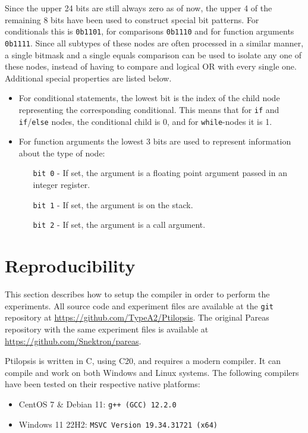 \documentclass[11pt,dvipsnames]{article}
\newcommand{\icpp}[1]{\texttt{#1}}
\newcommand{\mono}[1]{\texttt{#1}}
\newcommand{\Rplus}{\protect\hspace{-.1em}\protect\raisebox{.35ex}{\smaller{\smaller\textbf{+}}}}
\newcommand{\Cpp}{\mbox{C\Rplus\Rplus}\xspace}
\newcommand{\CppXX}{\mbox{C\Rplus\Rplus20}\xspace}
\begin{document}
Since the upper 24 bits are still always zero as of now, the upper 4 of the remaining 8 bits have been used to construct special bit patterns. For conditionals this is \mono{0b1101}, for comparisons \mono{0b1110} and for function arguments \mono{0b1111}. Since all subtypes of these nodes are often processed in a similar manner, a single bitmask and a single equals comparison can be used to isolate any one of these nodes, instead of having to compare and logical OR with every single one. Additional special properties are listed below.
\begin{itemize}
    \item For conditional statements, the lowest bit is the index of the child node representing the corresponding conditional. This means that for \icpp{if} and \icpp{if}/\icpp{else} nodes, the conditional child is 0, and for \icpp{while}-nodes it is 1.
    \item For function arguments the lowest 3 bits are used to represent information about the type of node:
    \begin{itemize}
        \item[\mono{bit 0}] - If set, the argument is a floating point argument passed in an integer register.
        \item[\mono{bit 1}] - If set, the argument is on the stack.
        \item[\mono{bit 2}] - If set, the argument is a call argument.
    \end{itemize}
\end{itemize}

\section{Reproducibility} \label{setup}
This section describes how to setup the compiler in order to perform the experiments. All source code and experiment files are available at the \mono{git} repository at \url{https://github.com/TypeA2/Ptilopsis}. The original Pareas repository with the same experiment files is available at \url{https://github.com/Snektron/pareas}.

Ptilopsis is written in \Cpp, using \CppXX, and requires a modern compiler. It can compile and work on both Windows and Linux systems. The following compilers have been tested on their respective native platforms:
\begin{itemize}
    \item CentOS 7 \& Debian 11: \mono{g++ (GCC) 12.2.0}
    \item Windows 11 22H2: \mono{MSVC Version 19.34.31721 (x64)}
\end{itemize}
\end{document}
